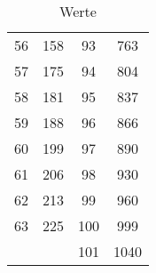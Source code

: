 \begin{table}
\begin{tabular}{c c || c c}
    56&      158& 93&      763\\
    57&      175& 94&      804\\
    58&      181& 95&      837\\
    59&      188& 96&      866\\
    60&      199& 97&      890\\
    61&      206& 98&      930\\
    62&      213& 99&      960\\
    63&      225& 100&     999\\
      &         & 101&     1040\\      
    \bottomrule        
    \end{tabular}
    \caption{Werte}
\end{table}
